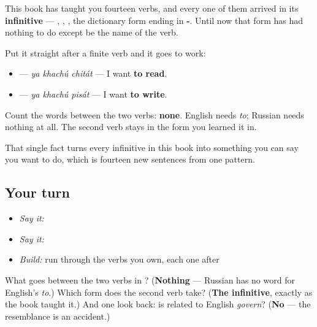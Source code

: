 \begin{grammarlens}[title={Grammar lens — the infinitive finally has somewhere to stand}]
This book has taught you fourteen verbs, and every one of them arrived in its \textbf{infinitive} — \emph{}, \emph{}, \emph{}, the dictionary form ending in \textbf{-}. Until now that form has had nothing to do except be the name of the verb.

Put it straight after a finite verb and it goes to work:

\begin{itemize}
\raggedright
  \item \textbf{  } — \emph{ya khachú chitát} — I want \textbf{to read}.
  \item \textbf{  } — \emph{ya khachú pisát} — I want \textbf{to write}.
\end{itemize}

Count the words between the two verbs: \textbf{none}. English needs \emph{to}; Russian needs nothing at all. The second verb stays in the form you learned it in.

That single fact turns every infinitive in this book into something you can say you want to do, which is fourteen new sentences from one pattern.
\end{grammarlens}

\subsection*{Your turn}
\begin{itemize}
\raggedright
  \item \emph{Say it:} \emph{  }
  \item \emph{Say it:} \emph{  }
  \item \emph{Build:} run through the verbs you own, each one after \emph{ }
\end{itemize}

\begin{tcolorbox}[breakable,colback=teal!4,colframe=teal!35!black,title={Before you move on}]
What goes between the two verbs in \emph{  }? (\textbf{Nothing} — Russian has no word for English's \emph{to}.) Which form does the second verb take? (\textbf{The infinitive}, exactly as the book taught it.) And one look back: is \emph{} related to English \emph{govern}? (\textbf{No} — the resemblance is an accident.)
\end{tcolorbox}
